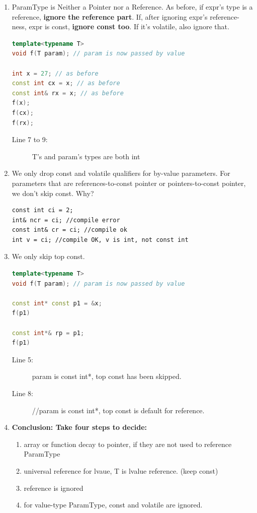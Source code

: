 \documentclass[a4paper,11pt,twoside]{book}
\begin{document}
\begin{enumerate}
	\item ParamType is Neither a Pointer nor a Reference. As before, if expr's type is a reference, \textbf{ignore the reference part}. If, after ignoring expr's reference-ness, expr is const, \textbf{ignore const too}. If it's volatile, also ignore that.
\begin{lstlisting}[frame=single, language=c++]
template<typename T>
void f(T param); // param is now passed by value
	
int x = 27; // as before
const int cx = x; // as before
const int& rx = x; // as before
f(x); 
f(cx); 
f(rx); 
\end{lstlisting}
\begin{description}
	\item[Line 7 to 9:] T's and param's types are both int
\end{description}
	
	\item We only drop const and volatile qualifiers for by-value parameters. For parameters that are references-to-const pointer or pointers-to-const pointer, we don't skip const. Why?
\begin{lstlisting}
const int ci = 2;
int& ncr = ci; //compile error
const int& cr = ci; //compile ok
int v = ci; //compile OK, v is int, not const int
\end{lstlisting}
	
	\item We only skip top const. 
\begin{lstlisting}[frame=single, language=c++]
template<typename T>
void f(T param); // param is now passed by value
	
const int* const p1 = &x;
f(p1)  
	
const int*& rp = p1;
f(p1)  
\end{lstlisting}
\begin{description}
	\item[Line 5:] param is const int*, top const has been skipped. 
	\item[Line 8:] //param is const int*, top const is default for reference. 
\end{description}
	
	\item \textbf{Conclusion:  Take four steps to decide:}
	\begin{enumerate}
		\item array or function decay to pointer, if they are not used to reference ParamType
		\item universal reference for lvaue, T is lvalue reference. (keep const)
		\item reference is ignored
		\item for value-type ParamType, const and volatile are ignored.
	\end{enumerate}
	

\end{enumerate}
\end{document}
